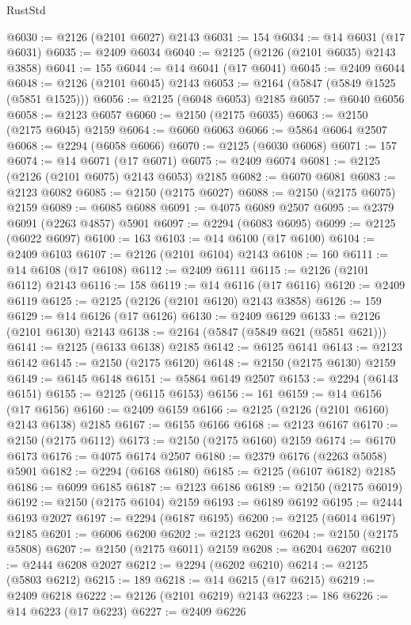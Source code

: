 \begin{lexlean}{RustStd}
\begin{coremodule}
@6030 := @2126 (@2101 @6027) @2143
@6031 := 154
@6034 := @14 @6031 (@17 @6031)
@6035 := @2409 @6034
@6040 := @2125 (@2126 (@2101 @6035) @2143 @3858)
@6041 := 155
@6044 := @14 @6041 (@17 @6041)
@6045 := @2409 @6044
@6048 := @2126 (@2101 @6045) @2143
@6053 := @2164 (@5847 (@5849 @1525 (@5851 @1525)))
@6056 := @2125 (@6048 @6053) @2185
@6057 := @6040 @6056
@6058 := @2123 @6057
@6060 := @2150 (@2175 @6035)
@6063 := @2150 (@2175 @6045) @2159
@6064 := @6060 @6063
@6066 := @5864 @6064 @2507
@6068 := @2294 (@6058 @6066)
@6070 := @2125 (@6030 @6068)
@6071 := 157
@6074 := @14 @6071 (@17 @6071)
@6075 := @2409 @6074
@6081 := @2125 (@2126 (@2101 @6075) @2143 @6053) @2185
@6082 := @6070 @6081
@6083 := @2123 @6082
@6085 := @2150 (@2175 @6027)
@6088 := @2150 (@2175 @6075) @2159
@6089 := @6085 @6088
@6091 := @4075 @6089 @2507
@6095 := @2379 @6091 (@2263 @4857) @5901
@6097 := @2294 (@6083 @6095)
@6099 := @2125 (@6022 @6097)
@6100 := 163
@6103 := @14 @6100 (@17 @6100)
@6104 := @2409 @6103
@6107 := @2126 (@2101 @6104) @2143
@6108 := 160
@6111 := @14 @6108 (@17 @6108)
@6112 := @2409 @6111
@6115 := @2126 (@2101 @6112) @2143
@6116 := 158
@6119 := @14 @6116 (@17 @6116)
@6120 := @2409 @6119
@6125 := @2125 (@2126 (@2101 @6120) @2143 @3858)
@6126 := 159
@6129 := @14 @6126 (@17 @6126)
@6130 := @2409 @6129
@6133 := @2126 (@2101 @6130) @2143
@6138 := @2164 (@5847 (@5849 @621 (@5851 @621)))
@6141 := @2125 (@6133 @6138) @2185
@6142 := @6125 @6141
@6143 := @2123 @6142
@6145 := @2150 (@2175 @6120)
@6148 := @2150 (@2175 @6130) @2159
@6149 := @6145 @6148
@6151 := @5864 @6149 @2507
@6153 := @2294 (@6143 @6151)
@6155 := @2125 (@6115 @6153)
@6156 := 161
@6159 := @14 @6156 (@17 @6156)
@6160 := @2409 @6159
@6166 := @2125 (@2126 (@2101 @6160) @2143 @6138) @2185
@6167 := @6155 @6166
@6168 := @2123 @6167
@6170 := @2150 (@2175 @6112)
@6173 := @2150 (@2175 @6160) @2159
@6174 := @6170 @6173
@6176 := @4075 @6174 @2507
@6180 := @2379 @6176 (@2263 @5058) @5901
@6182 := @2294 (@6168 @6180)
@6185 := @2125 (@6107 @6182) @2185
@6186 := @6099 @6185
@6187 := @2123 @6186
@6189 := @2150 (@2175 @6019)
@6192 := @2150 (@2175 @6104) @2159
@6193 := @6189 @6192
@6195 := @2444 @6193 @2027
@6197 := @2294 (@6187 @6195)
@6200 := @2125 (@6014 @6197) @2185
@6201 := @6006 @6200
@6202 := @2123 @6201
@6204 := @2150 (@2175 @5808)
@6207 := @2150 (@2175 @6011) @2159
@6208 := @6204 @6207
@6210 := @2444 @6208 @2027
@6212 := @2294 (@6202 @6210)
@6214 := @2125 (@5803 @6212)
@6215 := 189
@6218 := @14 @6215 (@17 @6215)
@6219 := @2409 @6218
@6222 := @2126 (@2101 @6219) @2143
@6223 := 186
@6226 := @14 @6223 (@17 @6223)
@6227 := @2409 @6226

\end{coremodule}
\end{lexlean}
